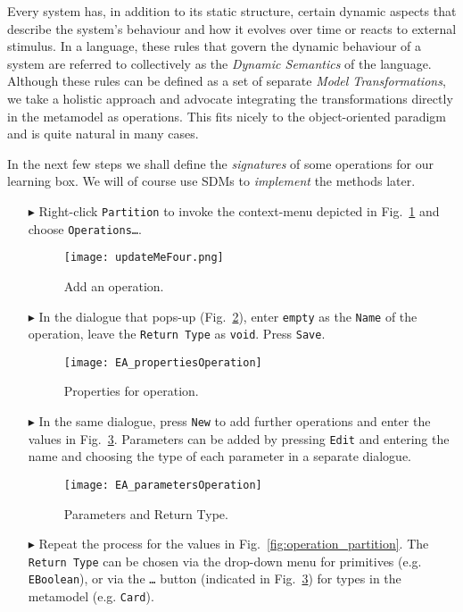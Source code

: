 Every system has, in addition to its static structure, certain dynamic aspects that describe the system's behaviour and how it evolves over time or reacts to external stimulus.
In a language, these rules that govern the dynamic behaviour of a system are referred to collectively as the \emph{Dynamic Semantics} of the language.
Although these rules can be defined as a set of separate \emph{Model Transformations}, we take a holistic approach and advocate integrating the transformations directly in the metamodel as operations.
This fits nicely to the object-oriented paradigm and is quite natural in many cases.

In the next few steps we shall define the \emph{signatures} of some operations for our learning box.
We will of course use SDMs to \emph{implement} the methods later.

\begin{enumerate}
\item[$\blacktriangleright$] Right-click \texttt{Partition} to invoke the context-menu depicted in Fig.~\ref{fig:add_operation} and choose \texttt{Operations\ldots}.

\begin{figure}[htbp]
	\centering
  \texttt{[image: updateMeFour.png]}
	\caption{Add an operation.}
	\label{fig:add_operation}
\end{figure}
\FloatBarrier

\item[$\blacktriangleright$] In the dialogue that pops-up (Fig.~\ref{fig:operation_properties}), enter \texttt{empty} as the \texttt{Name} of the operation, leave the \texttt{Return Type} as \texttt{void}.  Press \texttt{Save}.

\begin{figure}[htbp]
	\centering
  	\texttt{[image: EA\_propertiesOperation]}
	\caption{Properties for operation.}
	\label{fig:operation_properties}
\end{figure}
\FloatBarrier

\item[$\blacktriangleright$] In the same dialogue, press \texttt{New} to add further operations and enter the values in Fig.~\ref{fig:operation_parameters}.  Parameters can be added by pressing \texttt{Edit} and entering the name and choosing the type of each parameter in a separate dialogue.

\begin{figure}[htbp]
	\centering
  \texttt{[image: EA\_parametersOperation]}
	\caption{Parameters and Return Type.}
	\label{fig:operation_parameters}
\end{figure}
\FloatBarrier

\item[$\blacktriangleright$] Repeat the process for the values in Fig.~\ref{fig:operation_partition}.
The \texttt{Return Type} can be chosen via the drop-down menu for primitives (e.g. \texttt{EBoolean}), or via the \texttt{\ldots} button (indicated in Fig.~\ref{fig:operation_parameters}) for types in the metamodel (e.g. \texttt{Card}).
\end{enumerate}

